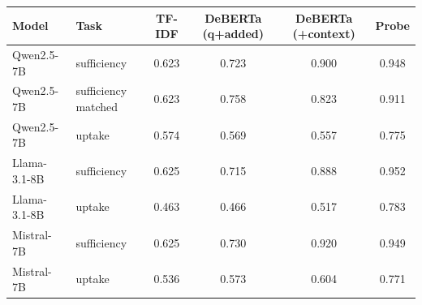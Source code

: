 \begin{tabular}{llcccc}
\toprule
Model & Task & TF-IDF & DeBERTa (q+added) & DeBERTa (+context) & Probe \\
\midrule
Qwen2.5-7B & sufficiency & 0.623 & 0.723 & 0.900 & 0.948 \\
Qwen2.5-7B & sufficiency matched & 0.623 & 0.758 & 0.823 & 0.911 \\
Qwen2.5-7B & uptake & 0.574 & 0.569 & 0.557 & 0.775 \\
Llama-3.1-8B & sufficiency & 0.625 & 0.715 & 0.888 & 0.952 \\
Llama-3.1-8B & uptake & 0.463 & 0.466 & 0.517 & 0.783 \\
Mistral-7B & sufficiency & 0.625 & 0.730 & 0.920 & 0.949 \\
Mistral-7B & uptake & 0.536 & 0.573 & 0.604 & 0.771 \\
\bottomrule
\end{tabular}

